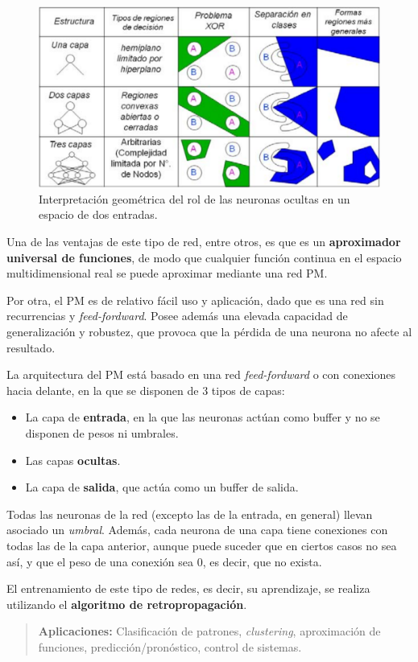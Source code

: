 \documentclass[10pt,a4paper]{article}
\begin{document}
\begin{figure}
  \label{fig:layers}
  \caption{Interpretación geométrica del rol de las neuronas ocultas en un espacio de dos entradas.}
  \centering
  \hbox{\includegraphics[width=0.65\textwidth-\fboxrule-\fboxrule]{layers.png}}  
\end{figure}	

Una de las ventajas de este tipo de red, entre otros, es que es un \textbf{aproximador universal de funciones}, de modo que cualquier función continua en el espacio multidimensional real se puede aproximar mediante una red PM.

Por otra, el PM es de relativo fácil uso y aplicación, dado que es una red sin recurrencias y \textit{feed-fordward}. Posee además una elevada capacidad de generalización y robustez, que provoca que la pérdida de una neurona no afecte al resultado.

La arquitectura del PM está basado en una red \textit{feed-fordward} o con conexiones hacia delante, en la que se disponen de 3 tipos de capas:
\begin{itemize}
\item La capa de \textbf{entrada}, en la que las neuronas actúan como buffer y no se disponen de pesos ni umbrales.
\item Las capas \textbf{ocultas}.
\item La capa de \textbf{salida}, que actúa como un buffer de salida.
\end{itemize}

Todas las neuronas de la red (excepto las de la entrada, en general) llevan asociado un \textit{umbral}. Además, cada neurona de una capa tiene conexiones con todas las de la capa anterior, aunque puede suceder que en ciertos casos no sea así, y que el peso de una conexión sea 0, es decir, que no exista.

El entrenamiento de este tipo de redes, es decir, su aprendizaje, se realiza utilizando el \textbf{algoritmo de retropropagación}.

\begin{quote}
\textbf{Aplicaciones:} Clasificación de patrones, \textit{clustering}, aproximación de funciones, predicción/pronóstico, control de sistemas.
\end{quote}
\end{document}
